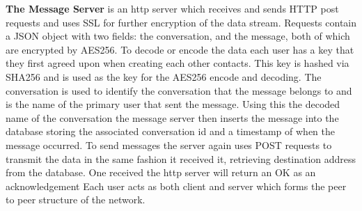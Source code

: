 \documentclass[../main/main.tex]{subfiles}
\begin{document}
\textbf{The Message Server} is an http server which receives and sends HTTP post requests and uses SSL for further encryption of the data stream. 
Requests contain a JSON object with two fields: the conversation, and the message, both of which are encrypted by AES256. 
To decode or encode the data each user has a key that they first agreed upon when creating each other contacts. 
This key is hashed via SHA256 and is used as the key for the AES256 encode and decoding. 
The conversation is used to identify the conversation that the message belongs to and is the name of the primary user that sent the message.
Using this the decoded name of the conversation the message server then inserts the message into the database storing the associated conversation id and a timestamp of when the message occurred.
To send messages the server again uses POST requests to transmit the data in the same fashion it received it, retrieving destination address from the database. 
One received the http server will return an OK as an acknowledgement
Each user acts as both client and server which forms the peer to peer structure of the network.
\begin{center}





\end{center}
\end{document}

